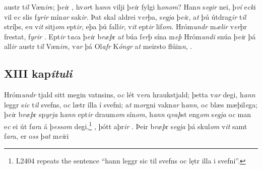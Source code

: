 austr t\textit{il} Væn\textit{ir}s; þ\textit{ei}r   , hv\textit{or}t h\textit{ann} vilji þ\textit{ei}r fylgi h\textit{onom}?
Han\textit{n} s\textit{egir} nei, þ\textit{ví} e\textit{ck}i vil 
e\textit{c}   slis f\textit{yrir} mín\textit{ar} sak\textit{ir}. Þat skal aldrei
v\textit{er}þa, s\textit{egja} þ\textit{ei}r, a\textit{t} þú   útdrag\textit{ir} t\textit{il} stríþs, e\textit{n} v\textit{it}
sitj\textit{om}  ept\textit{ir},  eþa þú fall\textit{ir},   v\textit{it} ept\textit{ir} lif\textit{om}. Hróm\textit{undr}
m\textit{ælir}  v\textit{er}þr  frestat,   f\textit{yrir}  . Ept\textit{ir}  t\textit{ac}a þ\textit{ei}r b\textit{ræþ}r  a\textit{t} búa
f\textit{er}þ sína m\textit{eþ} Hróm\textit{undi} snúa þ\textit{ei}r þá
all\textit{ir} austr t\textit{il} Væn\textit{ir}s, v\textit{ar} þá Ol\textit{afr} K\textit{óngr}
a\textit{t} meirsto flúin\textit{n},  . \pend \endnumbering  
\beginnumbering \pstart  
\vspace{5mm}\subsection*{XIII kap\textit{ítuli}} 
Hróm\textit{undr}  tjald sitt   megin vatnsins, o\textit{c} lét v\textit{er}a hraukstjald;
þetta v\textit{ar}
 degi,  h\textit{ann} leggr
s\textit{ic} t\textit{il} svefns, o\textit{c} lætr ílla í svefni;
a\textit{t} m\textit{or}gni vakn\textit{ar} h\textit{ann},
o\textit{c} blæs mæþil\textit{e}ga; þ\textit{ei}r b\textit{ræþ}r
sp\textit{yrja} h\textit{ann} ept\textit{ir} draum\textit{om} sín\textit{om},   h\textit{ann} q\textit{vaþ}st eng\textit{om} s\textit{egja} o\textit{c} man e\textit{c} ei út f\textit{ar}a á þ\textit{ess}\textit{om} degi,\footnote{L2404 repeats the sentence \enquote{hann leggr sic til svefns oc lętr illa i	svefni}.}  , þótt aþr\textit{ir} . Þeir b\textit{ræþ}r s\textit{egja} þá skul\textit{om} v\textit{it} samt f\textit{ar}a,  er o\textit{ss} þ\textit{at} m\textit{ei}ri
